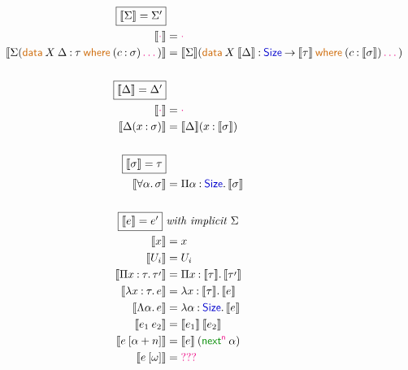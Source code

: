 \documentclass{article}
\newcommand{\meta}[1]{\mathsf{\textcolor{metacolour}{#1}}}
\newcommand{\ind}[1]{\mathsf{\textcolor{indcolour}{#1}}}
\newcommand{\constr}[1]{\mathsf{\textcolor{constrcolour}{#1}}}
\newcommand{\kw}[1]{\mathsf{\textcolor{kwcolour}{#1}}}
\newcommand{\kwopen}[1]{\kw{#1}\:}
\newcommand{\kwbin}[1]{\:\kw{#1}\:}
\newcommand{\pr}[1]{\raisebox{-#1pt}{$^\prime$}}
\newcommand{\taupr}{\tau\pr{2}}
\newcommand{\poly}[2]{\forall #1 \mathpunct{.} #2}
\newcommand{\suc}[1]{\widehat{#1}}
\newcommand{\fun}[3]{\Pi #1 \mathbin{:} #2 \mathpunct{.} #3}
\newcommand{\arr}[2]{#1 \mathbin{\rightarrow} #2}
\newcommand{\lam}[3]{\lambda #1 \mathbin{:} #2 \mathpunct{.} #3}
\newcommand{\Lam}[2]{\Lambda #1 \mathpunct{.} #2}
\newcommand{\app}[2]{#1 \: #2}
\newcommand{\App}[2]{#1 \: \mathopen{[} #2 \mathclose{]}}
\newcommand{\data}[3]{\kwopen{data} #1 \mathbin{:} #2 \kwbin{where} #3}
\newcommand{\annot}[2]{#1 \mathbin{:} #2}
\newcommand{\Size}{\ind{Size}}
\newcommand{\next}{\constr{next}}
\newcommand{\nil}{\meta{\cdot}}
\newcommand{\seq}{\,\meta{\dots}\,}
\newcommand{\compile}[1]{\mathopen{\llbracket} #1 \mathclose{\rrbracket}}
\newcommand{\huh}{\meta{???}}
\begin{document}
\iffalse
\begin{figure}[h]
    \centering
    \begin{align*}
        \fbox{$\compile{\Sigma} = \Sigma'$} \hfill \\
        \compile{\nil} &= \nil \\
        \compile{\Sigma(\data{\app{X}{\Delta}}{\tau}{(\annot{c}{\sigma}) \seq})} &= \compile{\Sigma}(\data{\app{X}{\compile{\Delta}}}{\arr{\Size}{\compile{\tau}}}{(\annot{c}{\compile{\sigma}}) \seq}) \\
        \hfill \\
        \fbox{$\compile{\Delta} = \Delta'$} \hfill \\
        \compile{\nil} &= \nil \\
        \compile{\Delta(\annot{x}{\sigma})} &= \compile{\Delta}(\annot{x}{\compile{\sigma}}) \\
        \hfill \\
        \iffalse
        \fbox{$\compile{s} = e$} \hfill \\
        \compile{\alpha} &= \alpha \\
        \compile{\suc{s}} &= \app{\next}{s} \\
        \compile{\omega} &= \textit{???} \\
        \hfill \\
        \fi
        \fbox{$\compile{\sigma} = \tau$} \hfill \\
        \compile{\poly{\alpha}{\sigma}} &= \fun{\alpha}{\Size}{\compile{\sigma}} \\
        \hfill \\
        \fbox{$\compile{e} = e'$} ~ &\textit{with implicit $\Sigma$} \hfill \\
        \compile{x} &= x \\
        \compile{U_i} &= U_i \\
        \compile{\fun{x}{\tau}{\taupr}} &= \fun{x}{\compile{\tau}}{\compile{\taupr}} \\
        \compile{\lam{x}{\tau}{e}} &= \lam{x}{\compile{\tau}}{\compile{e}} \\
        \compile{\Lam{\alpha}{e}} &= \lam{\alpha}{\Size}{\compile{e}} \\
        \compile{\app{e_1}{e_2}} &= \app{\compile{e_1}}{\compile{e_2}} \\
        \compile{\App{e}{\alpha + n}} &= \app{\compile{e}}{(\app{\next^\meta{n}}{\alpha})} \\
        \compile{\App{e}{\omega}} &= \huh \\

\end{align*}
\end{figure}
\end{document}
